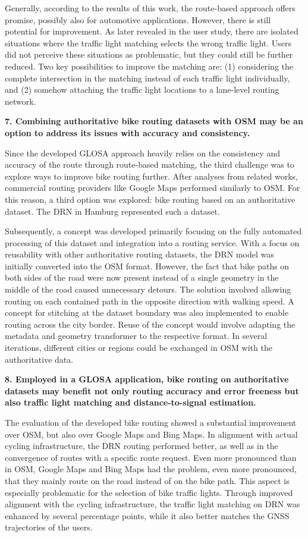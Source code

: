 Generally, according to the results of this work, the route-based approach offers promise, possibly also for automotive applications. However, there is still potential for improvement. As later revealed in the user study, there are isolated situations where the traffic light matching selects the wrong traffic light. Users did not perceive these situations as problematic, but they could still be further reduced. Two key possibilities to improve the matching are: (1) considering the complete intersection in the matching instead of each traffic light individually, and (2) somehow attaching the traffic light locations to a lane-level routing network. 

\textbf{\color{cidarkblue}7. Combining authoritative bike routing datasets with OSM may be an option to address its issues with accuracy and consistency.}

Since the developed GLOSA approach heavily relies on the consistency and accuracy of the route through route-based matching, the third challenge was to explore ways to improve bike routing further. After analyses from related works, commercial routing providers like Google Maps performed similarly to OSM. For this reason, a third option was explored: bike routing based on an authoritative dataset. The DRN in Hamburg represented such a dataset. 

Subsequently, a concept was developed primarily focusing on the fully automated processing of this dataset and integration into a routing service. With a focus on reusability with other authoritative routing datasets, the DRN model was initially converted into the OSM format. However, the fact that bike paths on both sides of the road were now present instead of a single geometry in the middle of the road caused unnecessary detours. The solution involved allowing routing on each contained path in the opposite direction with walking speed. A concept for stitching at the dataset boundary was also implemented to enable routing across the city border. Reuse of the concept would involve adapting the metadata and geometry transformer to the respective format. In several iterations, different cities or regions could be exchanged in OSM with the authoritative data.

\newpage
\textbf{\color{cidarkblue}8. Employed in a GLOSA application, bike routing on authoritative datasets may benefit not only routing accuracy and error freeness but also traffic light matching and distance-to-signal estimation.} 

The evaluation of the developed bike routing showed a substantial improvement over OSM, but also over Google Maps and Bing Maps. In alignment with actual cycling infrastructure, the DRN routing performed better, as well as in the convergence of routes with a specific route request. Even more pronounced than in OSM, Google Maps and Bing Maps had the problem, even more pronounced, that they mainly route on the road instead of on the bike path. This aspect is especially problematic for the selection of bike traffic lights. Through improved alignment with the cycling infrastructure, the traffic light matching on DRN was enhanced by several percentage points, while it also better matches the GNSS trajectories of the users. 

